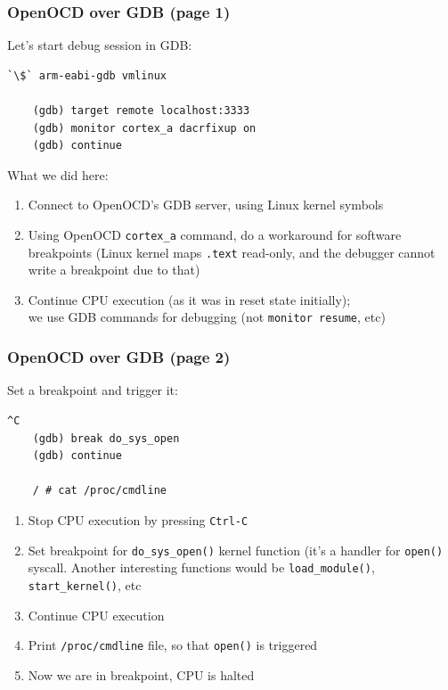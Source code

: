 \begin{frame}[containsverbatim]
  \frametitle{OpenOCD over GDB (page 1)}
  Let's start debug session in GDB:
  \begin{lstlisting}[numbers=none]
    `\$` arm-eabi-gdb vmlinux

    (gdb) target remote localhost:3333
    (gdb) monitor cortex_a dacrfixup on
    (gdb) continue
  \end{lstlisting}
  What we did here:
  \begin{enumerate}
    \item Connect to OpenOCD's GDB server, using Linux kernel symbols
    \item Using OpenOCD \texttt{cortex\_a} command, do a workaround for software
          breakpoints (Linux kernel maps \texttt{.text} read-only, and the
          debugger cannot write a breakpoint due to that)
    \item Continue CPU execution (as it was in reset state initially);\\
          we use GDB commands for debugging (not \texttt{monitor resume}, etc)
  \end{enumerate}
\end{frame}

\begin{frame}[containsverbatim]
  \frametitle{OpenOCD over GDB (page 2)}
  \vspace*{-5mm}
  Set a breakpoint and trigger it:
  \begin{lstlisting}[numbers=none]
    ^C
    (gdb) break do_sys_open
    (gdb) continue

    / # cat /proc/cmdline
  \end{lstlisting}
  \begin{enumerate}
    \item Stop CPU execution by pressing \texttt{Ctrl-C}
    \item Set breakpoint for \texttt{do\_sys\_open()} kernel function (it's a
          handler for \texttt{open()} syscall. Another interesting functions
          would be \texttt{load\_module()}, \texttt{start\_kernel()}, etc
    \item Continue CPU execution
    \item Print \texttt{/proc/cmdline} file, so that \texttt{open()} is
          triggered
    \item Now we are in breakpoint, CPU is halted
  \end{enumerate}
  \vspace*{-5mm}
\end{frame}

